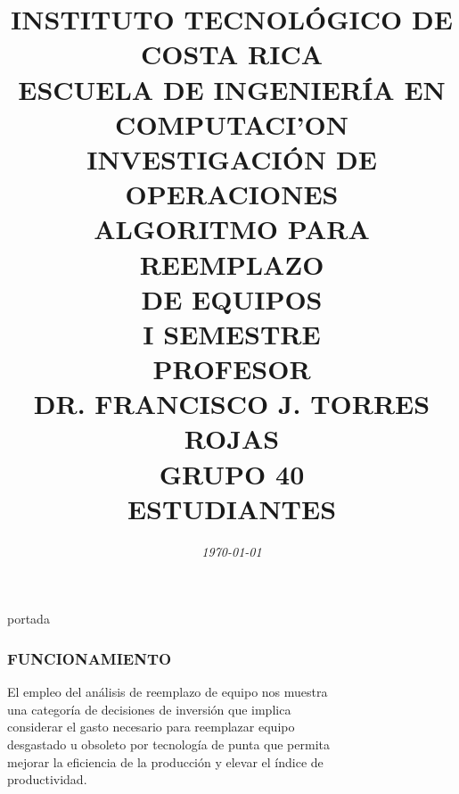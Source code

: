 \documentclass[10]{beamer}
\title{{\color{WHITE} \large \textbf{INSTITUTO TECNOL\'OGICO DE COSTA RICA}} \\ \vspace{0.02cm} 
{\color{WHITE} \large \textbf{ESCUELA DE INGENIER\'IA EN COMPUTACI'ON }} \\ \vspace{0.02cm} 
{\color{WHITE} \large \textbf{INVESTIGACI\'ON DE OPERACIONES  }} \\ \vspace{0.02cm} 
{\color{WHITE} \large \textbf{ALGORITMO PARA REEMPLAZO \\ DE EQUIPOS  }} \\ \vspace{0.02cm} 
{\color{WHITE} \large \textbf{I SEMESTRE  }}\\ \vspace{0.02cm}
{\color{WHITE} \large \textbf{PROFESOR}} \\ \vspace{0.02cm}
{\color{WHITE} \large DR. FRANCISCO J. TORRES ROJAS  } \\ \vspace{0.02cm}
{\color{WHITE} \large \textbf{GRUPO 40}} \\ \vspace{0.01cm}
{\color{WHITE} \large \textbf{ESTUDIANTES} }}
\date{\em \color{WHITE} \today}
\begin{document}
\begin{frame}
\color{white}
\titlepage portada
\end{frame} 
\begin{frame}
\color{white}
\frametitle{FUNCIONAMIENTO}
El empleo del an\'alisis de reemplazo de equipo nos muestra 
\\una categor\'ia de decisiones de inversi\'on que implica 
\\considerar el gasto necesario para reemplazar equipo 
\\ desgastado u obsoleto por tecnolog\'ia de punta que permita
\\ mejorar la eficiencia de la producci\'on y elevar el \'indice de 
\\ productividad.
\end{frame} 
\end{document}
